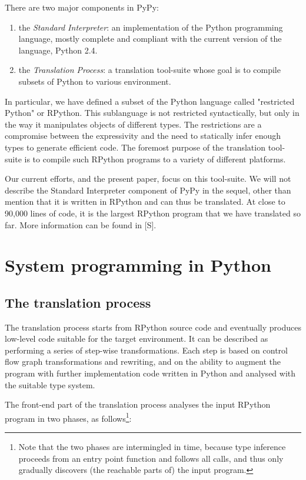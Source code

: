 \documentclass{acm_proc_article-sp}
\begin{document}
There are two major components in PyPy:
%
\begin{enumerate}
\item the \textit{Standard Interpreter}: an implementation of the Python programming
language, mostly complete and compliant with the current version of the
language, Python 2.4.
\item the \textit{Translation Process}: a translation tool-suite whose goal is to
compile subsets of Python to various environment.
\end{enumerate}
%
In particular, we have defined a subset of the Python language called
"restricted Python" or RPython.  This sublanguage is not restricted
syntactically, but only in the way it manipulates objects of different
types.  The restrictions are a compromise between the expressivity and
the need to statically infer enough types to generate efficient code.
The foremost purpose of the translation tool-suite is to compile such
RPython programs to a variety of different platforms.

Our current efforts, and the present paper, focus on this tool-suite.
We will not describe the Standard Interpreter component of PyPy in the
sequel, other than mention that it is written in RPython and can thus be
translated.  At close to 90,000 lines of code, it is the largest RPython
program that we have translated so far.  More information can be found
in [S].


\section{System programming in Python}
\label{systemprog}

\hypertarget{the-translation-process}{}
\subsection{The translation process}
\label{translationprocess}

The translation process starts from RPython source code and eventually
produces low-level code suitable for the target environment.  It can be
described as performing a series of step-wise transformations.  Each
step is based on control flow graph transformations and rewriting, and
on the ability to augment the program with further implementation code
written in Python and analysed with the suitable type system.

The front-end part of the translation process analyses the input
RPython program in two phases, as follows\footnote{Note that the two
phases are intermingled in time, because type inference proceeds from
an entry point function and follows all calls, and thus only gradually
discovers (the reachable parts of) the input program.}:
\end{document}
